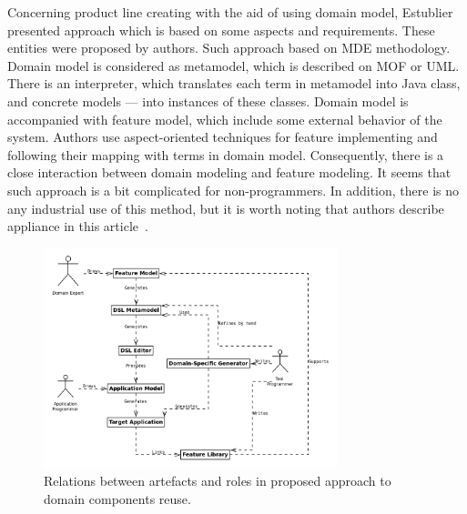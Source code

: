 \documentclass[conference]{IEEEtran}
\begin{document}
Concerning product line creating with the aid of using domain model, Estublier~\cite{estublier2005reuse} presented approach which is based on some aspects and requirements. These entities were proposed by authors. Such approach based on MDE methodology. Domain model is considered as  metamodel, which is described on MOF or UML. There is an interpreter, which translates each term in metamodel into Java class, and concrete models --- into instances of these classes. Domain model is accompanied with feature model, which include some external behavior of the system. Authors use aspect-oriented techniques for feature implementing and following their mapping with terms in domain model. Consequently, there is a close interaction between domain modeling and feature modeling. It seems that such approach is a bit complicated for non-programmers. In addition, there is no any industrial use of this method, but it is worth noting that authors describe appliance in this article~\cite{estublier2003approach}. 

\begin{figure}[ht]
	\centering
	\includegraphics[width=0.76\textwidth]{process.png}
	\caption{Relations between artefacts and roles in proposed approach to domain components reuse.}
	\label{image:process}
\end{figure}
\end{document}
